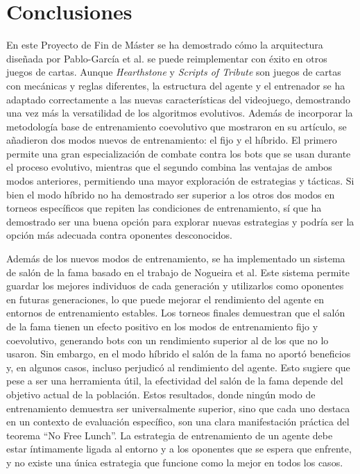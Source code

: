 \chapter{Conclusiones} \label{chap:conclusiones}

En este Proyecto de Fin de Máster se ha demostrado cómo la arquitectura diseñada por Pablo-García et al. se puede reimplementar con éxito en otros juegos de cartas. Aunque \textit{Hearthstone} y \textit{Scripts of Tribute} son juegos de cartas con mecánicas y reglas diferentes, la estructura del agente y el entrenador se ha adaptado correctamente a las nuevas características del videojuego, demostrando una vez más la versatilidad de los algoritmos evolutivos. Además de incorporar la metodología base de entrenamiento coevolutivo que mostraron en su artículo, se añadieron dos modos nuevos de entrenamiento: el fijo y el híbrido. El primero permite una gran especialización de combate contra los bots que se usan durante el proceso evolutivo, mientras que el segundo combina las ventajas de ambos modos anteriores, permitiendo una mayor exploración de estrategias y tácticas. Si bien el modo híbrido no ha demostrado ser superior a los otros dos modos en torneos específicos que repiten las condiciones de entrenamiento, sí que ha demostrado ser una buena opción para explorar nuevas estrategias y podría ser la opción más adecuada contra oponentes desconocidos.

Además de los nuevos modos de entrenamiento, se ha implementado un sistema de salón de la fama basado en el trabajo de Nogueira et al. Este sistema permite guardar los mejores individuos de cada generación y utilizarlos como oponentes en futuras generaciones, lo que puede mejorar el rendimiento del agente en entornos de entrenamiento estables. Los torneos finales demuestran que el salón de la fama tienen un efecto positivo en los modos de entrenamiento fijo y coevolutivo, generando bots con un rendimiento superior al de los que no lo usaron. Sin embargo, en el modo híbrido el salón de la fama no aportó beneficios y, en algunos casos, incluso perjudicó al rendimiento del agente. Esto sugiere que pese a ser una herramienta útil, la efectividad del salón de la fama depende del objetivo actual de la población. Estos resultados, donde ningún modo de entrenamiento demuestra ser universalmente superior, sino que cada uno destaca en un contexto de evaluación específico, son una clara manifestación práctica del teorema ``No Free Lunch''. La estrategia de entrenamiento de un agente debe estar íntimamente ligada al entorno y a los oponentes que se espera que enfrente, y no existe una única estrategia que funcione como la mejor en todos los casos.

